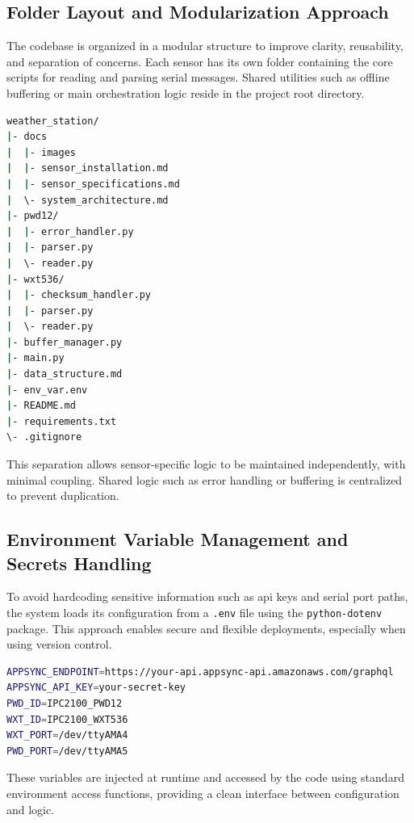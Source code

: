 \subsection{Folder Layout and Modularization Approach}

The codebase is organized in a modular structure to improve clarity, reusability, and separation of concerns. Each sensor has its own folder containing the core scripts for reading and parsing serial messages. Shared utilities such as offline buffering or main orchestration logic reside in the project root directory.
{\small
\begin{lstlisting}[language=bash,caption={Project folder layout (simplified)},label={lst:folder-structure-ascii}]
    weather_station/
|- docs
|  |- images
|  |- sensor_installation.md
|  |- sensor_specifications.md
|  \- system_architecture.md
|- pwd12/
|  |- error_handler.py
|  |- parser.py
|  \- reader.py
|- wxt536/
|  |- checksum_handler.py
|  |- parser.py
|  \- reader.py
|- buffer_manager.py
|- main.py
|- data_structure.md
|- env_var.env
|- README.md
|- requirements.txt
\- .gitignore
\end{lstlisting}
}



This separation allows sensor-specific logic to be maintained independently, with minimal coupling. Shared logic such as error handling or buffering is centralized to prevent duplication.

\subsection{Environment Variable Management and Secrets Handling}

To avoid hardcoding sensitive information such as \gls{api} keys and serial port paths, the system loads its configuration from a \texttt{.env} file using the \texttt{python-dotenv} package. This approach enables secure and flexible deployments, especially when using version control.
{\small
\begin{lstlisting}[language=bash,caption={Example .env file entries},label={lst:.env}]
APPSYNC_ENDPOINT=https://your-api.appsync-api.amazonaws.com/graphql
APPSYNC_API_KEY=your-secret-key
PWD_ID=IPC2100_PWD12
WXT_ID=IPC2100_WXT536
WXT_PORT=/dev/ttyAMA4
PWD_PORT=/dev/ttyAMA5
\end{lstlisting}
}
These variables are injected at runtime and accessed by the code using standard environment access functions, providing a clean interface between configuration and logic.



